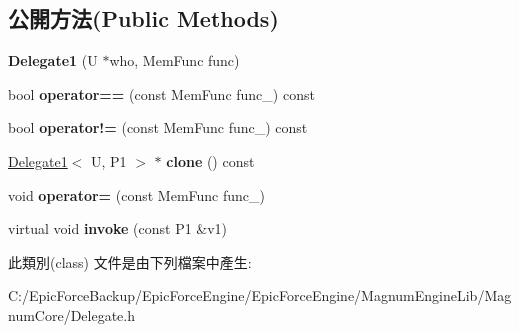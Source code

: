 \subsection*{公開方法(Public Methods)}
\begin{DoxyCompactItemize}
\item 
{\bfseries Delegate1} (U $\ast$who, Mem\+Func func)\hypertarget{class_magnum_1_1_delegate1_a116a054cd3ceb5a0246b127e428d255d}{}\label{class_magnum_1_1_delegate1_a116a054cd3ceb5a0246b127e428d255d}

\item 
bool {\bfseries operator==} (const Mem\+Func func\+\_\+) const \hypertarget{class_magnum_1_1_delegate1_a284382f42f0efb2d45cf166e4457bf51}{}\label{class_magnum_1_1_delegate1_a284382f42f0efb2d45cf166e4457bf51}

\item 
bool {\bfseries operator!=} (const Mem\+Func func\+\_\+) const \hypertarget{class_magnum_1_1_delegate1_a99b62a17a620e77869324212ea84045f}{}\label{class_magnum_1_1_delegate1_a99b62a17a620e77869324212ea84045f}

\item 
\hyperlink{class_magnum_1_1_delegate1}{Delegate1}$<$ U, P1 $>$ $\ast$ {\bfseries clone} () const \hypertarget{class_magnum_1_1_delegate1_ac0c7e87e5ee5b91604f72d2475642fb6}{}\label{class_magnum_1_1_delegate1_ac0c7e87e5ee5b91604f72d2475642fb6}

\item 
void {\bfseries operator=} (const Mem\+Func func\+\_\+)\hypertarget{class_magnum_1_1_delegate1_a55e30b1b67501e30cda01f0cceae9f67}{}\label{class_magnum_1_1_delegate1_a55e30b1b67501e30cda01f0cceae9f67}

\item 
virtual void {\bfseries invoke} (const P1 \&v1)\hypertarget{class_magnum_1_1_delegate1_ad6d639631977f52d21b99f3ec430db92}{}\label{class_magnum_1_1_delegate1_ad6d639631977f52d21b99f3ec430db92}

\end{DoxyCompactItemize}


此類別(class) 文件是由下列檔案中產生\+:\begin{DoxyCompactItemize}
\item 
C\+:/\+Epic\+Force\+Backup/\+Epic\+Force\+Engine/\+Epic\+Force\+Engine/\+Magnum\+Engine\+Lib/\+Magnum\+Core/Delegate.\+h\end{DoxyCompactItemize}
